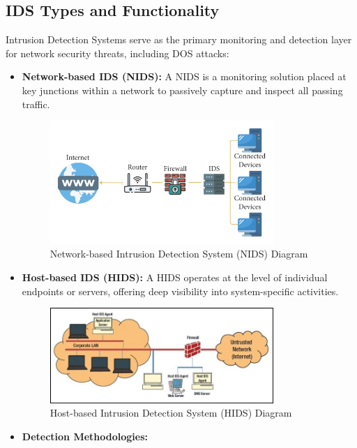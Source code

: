 \documentclass[12pt]{report}
\begin{document}
\subsection{IDS Types and Functionality}
Intrusion Detection Systems serve as the primary monitoring and detection layer for network security threats, including DOS attacks:
\begin{itemize}
    \item \textbf{Network-based IDS (NIDS):} A NIDS is a monitoring solution placed at key junctions within a network to passively capture and inspect all passing traffic.
        \begin{figure}[ht]
            \centering
            \includegraphics[width=0.8\textwidth]{images/nids-diagram.jpg}
            \caption{Network-based Intrusion Detection System (NIDS) Diagram}
            \label{fig:nids-diagram}
        \end{figure}
    \item \textbf{Host-based IDS (HIDS):} A HIDS operates at the level of individual endpoints or servers, offering deep visibility into system-specific activities.
        \begin{figure}[ht]
            \centering
            \includegraphics[width=0.8\textwidth]{images/hids-diagram.jpg}
            \caption{Host-based Intrusion Detection System (HIDS) Diagram}
            \label{fig:hids-diagram}
        \end{figure}
    \item \textbf{Detection Methodologies:}

\end{itemize}
\end{document}
